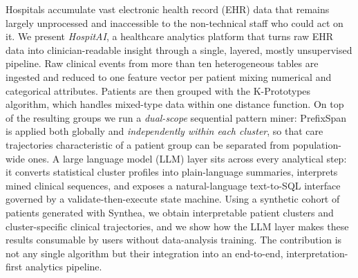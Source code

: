 Hospitals accumulate vast electronic health record (EHR) data that remains
largely unprocessed and inaccessible to the non-technical staff who could act
on it. We present \textit{HospitAI}, a healthcare analytics platform that turns
raw EHR data into clinician-readable insight through a single, layered, mostly
unsupervised pipeline. Raw clinical events from more than ten heterogeneous
tables are ingested and reduced to one feature vector per patient mixing
numerical and categorical attributes. Patients are then grouped with the
K-Prototypes algorithm, which handles mixed-type data within one distance
function. On top of the resulting groups we run a \emph{dual-scope}
sequential pattern miner: PrefixSpan is applied both globally and
\emph{independently within each cluster}, so that care trajectories
characteristic of a patient group can be separated from population-wide ones.
A large language model (LLM) layer sits across every analytical step: it
converts statistical cluster profiles into plain-language summaries, interprets
mined clinical sequences, and exposes a natural-language text-to-SQL interface
governed by a validate-then-execute state machine. Using a synthetic cohort of
\NPATIENTS{} patients generated with Synthea, we obtain interpretable patient
clusters and cluster-specific clinical trajectories, and we show how the LLM
layer makes these results consumable by users without data-analysis training.
The contribution is not any single algorithm but their integration into an
end-to-end, interpretation-first analytics pipeline.
